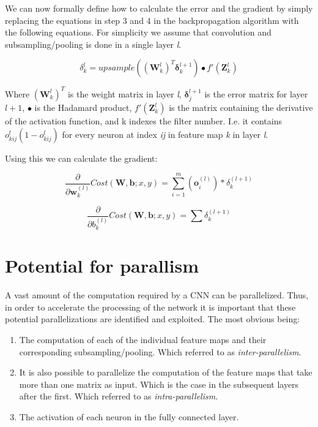 We can now formally define how to calculate the error and the gradient by simply replacing the equations in step 3 and 4 in the backpropagation algorithm with the following equations. For simplicity we assume that convolution and subsampling/pooling is done in a single layer \textit{l}.




\begin{equation}
	\delta_{k}^{l} =  upsample( (\mathbf{W}_{k}^l)^T \mathbf{\delta}_{k}^{l+1})\bullet f'(\mathbf{Z}_k^l)
\end{equation}

Where $  (\mathbf{W}_{k}^l)^T $ is the weight matrix in layer \textit{l}, $  \mathbf{\delta}_{j}^{l+1} $ is the error matrix for layer $ l + 1 $, $ \bullet $ is the Hadamard product, $ f'(\mathbf{Z}_k^l) $ is the matrix containing the derivative of the activation function, and k indexes the filter number. I.e. it contains $ o_{kij}^l(1-o_{kij}^l) $ for every neuron at index \textit{ij} in feature map \textit{k} in layer \textit{l}. 

Using this we can calculate the gradient:

\begin{equation}
	\frac{\partial}{\partial \mathbf{w}_k^{(l)} }Cost(\mathbf{W,b}; x, y) = \sum_{i=1}^{m}(\mathbf{o}_i^{(l)})*\delta_k^{(l+1)}
\end{equation}

\begin{equation}
	\frac{\partial}{\partial b_k^{(l)} }Cost(\mathbf{W,b}; x, y) = \sum\delta_k^{(l+1)}
\end{equation}

\section{Potential for parallism} \label{sec_pot_parallelism} 

A vast amount of the computation required by a CNN can be parallelized. Thus, in order to accelerate the processing of the network it is important that these potential parallelizations are identified and exploited. The most obvious being:

\begin{enumerate}
	\item The computation of each of the individual feature maps and their corresponding subsampling/pooling. Which \cite{Chakradhar2010} referred to as \textit{inter-parallelism}.
	\item It is also possible to parallelize the computation of the feature maps that take more than one matrix as input. Which is the case in the subsequent layers after the first. Which \cite{Chakradhar2010} referred to as \textit{intra-parallelism}.
	\item The activation of each neuron in the fully connected layer. 	
\end{enumerate}

